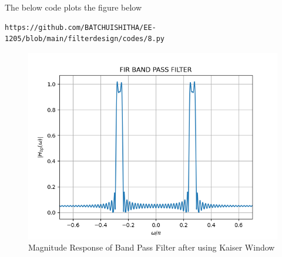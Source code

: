 \documentclass{article}
\begin{document}
The below code plots the figure below
\begin{lstlisting}
https://github.com/BATCHUISHITHA/EE-1205/blob/main/filterdesign/codes/8.py
\end{lstlisting} 
\begin{figure}[H]
\centering
\includegraphics[width=\columnwidth]{figs/8.png}
\caption{Magnitude Response of Band Pass Filter after using Kaiser Window}
\label{fig:Kaiser_BPF_response}
\end{figure}
\end{document}
